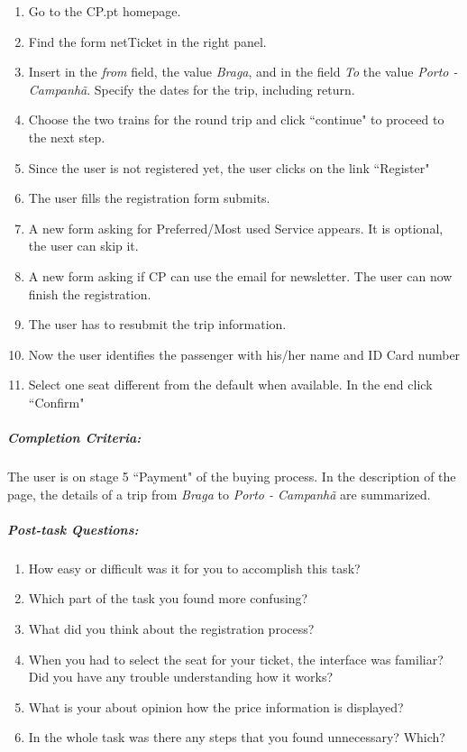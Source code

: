 \documentclass[a4paper]{article}
\begin{document}
\begin{enumerate}[label=\roman*.]
  \item Go to the CP.pt homepage.
  \item Find the form netTicket in the right panel.
  \item Insert in the \emph{from} field, the value \emph{Braga}, and in the field \emph{To} the value \emph{Porto - Campanhã}. Specify the dates for the trip, including return.
  \item Choose the two trains for the round trip and click ``continue" to proceed to the next step.
  \item Since the user is not registered yet, the user clicks on the link ``Register"
  \item The user fills the registration form submits.
  \item A new form asking for Preferred/Most used Service appears. It is optional, the user can skip it.
  \item A new form asking if CP can use the email for newsletter. The user can now finish the registration.
  \item The user has to resubmit the trip information.
  \item Now the user identifies the passenger with his/her name and ID Card number
  \item Select one seat different from the default when available. In the end click ``Confirm"
\end{enumerate}

\subparagraph{Completion Criteria:} The user is on stage 5 ``Payment" of the buying process. In the description of the page, the details of a trip from \textit{Braga} to \textit{Porto - Campanhã} are summarized.

\subparagraph{Post-task Questions:}

\begin{enumerate}[label=4.\theenumi{}.]
  \item How easy or difficult was it for you to accomplish this task?
  \item Which part of the task you found more confusing?
  \item What did you think about the registration process?
  \item When you had to select the seat for your ticket, the interface was familiar? Did you have any trouble understanding how it works?
  \item What is your about opinion how the price information is displayed?
  \item In the whole task was there any steps that you found unnecessary? Which?
\end{enumerate}
\end{document}
